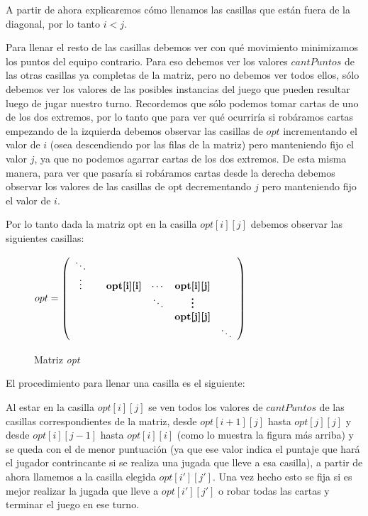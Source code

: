 A partir de ahora explicaremos cómo llenamos las casillas que están fuera de la diagonal, por lo tanto $i < j$.

Para llenar el resto de las casillas debemos ver con qué movimiento minimizamos los puntos del equipo contrario. Para eso debemos ver los valores $cantPuntos$ de las otras casillas ya completas de la matriz, pero no debemos ver todos ellos, sólo debemos ver los valores de las posibles instancias del juego que pueden resultar luego de jugar nuestro turno. Recordemos que sólo podemos tomar cartas de uno de los dos extremos, por lo tanto que para ver qué ocurriría si robáramos cartas empezando de la izquierda debemos observar las casillas de $opt$ incrementando el valor de $i$ (osea descendiendo por las filas de la matriz) pero manteniendo fijo el valor $j$, ya que no podemos agarrar cartas de los dos extremos. De esta misma manera, para ver que pasaría si robáramos cartas desde la derecha debemos observar los valores de las casillas de opt decrementando $j$ pero manteniendo fijo el valor de $i$.

Por lo tanto dada la matriz opt en la casilla $opt[i][j]$ debemos observar las siguientes casillas:

\begin{figure}[H]
\begin{center}
$opt= \left(
\begin{array}{cccccc}
 \ddots & & & & \\ 
 \vdots & & \textbf{opt[i][i]} & \cdots & \textbf{opt[i][j]} \\
 & & & \ddots & \textbf{\vdots} & \\
 & & & & \textbf{opt[j][j]} &\\
 & & & & & \ddots \\
 
\end{array}
\right)$
\caption{Matriz \emph{opt}}
\end{center}
\end{figure}

El procedimiento para llenar una casilla es el siguiente:

Al estar en la casilla $opt[i][j]$ se ven todos los valores de $cantPuntos$ de las casillas correspondientes de la matriz, desde $opt[i+1][j]$ hasta $opt[j][j]$ y desde $opt[i][j-1]$ hasta $opt[i][i]$ (como lo muestra la figura más arriba) y se queda con el de menor puntuación (ya que ese valor indica el puntaje que hará el jugador contrincante si se realiza una jugada que lleve a esa casilla), a partir de ahora llamemos a la casilla elegida $opt[i'][j']$. Una vez hecho esto se fija si es mejor realizar la jugada que lleve a $opt[i'][j']$ o robar todas las cartas y terminar el juego en ese turno. 

